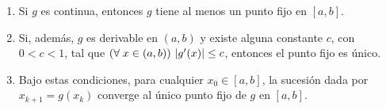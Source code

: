 \begin{enumerate}[label=(\roman*)]
\item Si $g$ es continua, entonces $g$ tiene al menos un punto fijo en
$[a,b]$.

\item Si, además, $g$ es derivable en $(a,b)$ y existe alguna constante $c$,
    con $0 < c < 1$, tal que
    $\left(\forall\;x \in (a,b)\right)\, \lvert g'(x) \rvert \leq c$,
    entonces el punto fijo es único.

\item Bajo estas condiciones, para cualquier $x_0 \in [a,b]$, la sucesión dada
    por $x_{k+1} = g(x_k)$ converge al único punto fijo de $g$ en $[a,b]$.

    \label{item:punto-fijo-cond-convergencia}
\end{enumerate}

